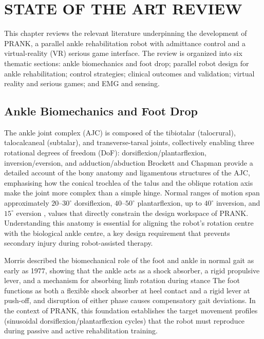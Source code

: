 \chapter{STATE OF THE ART REVIEW}

This chapter reviews the relevant literature underpinning the development of PRANK, a parallel ankle rehabilitation robot with admittance control and a virtual-reality (VR) serious game interface. The review is organized into six thematic sections: ankle biomechanics and foot drop; parallel robot design for ankle rehabilitation; control strategies; clinical outcomes and validation; virtual reality and serious games; and EMG and sensing.

\section{Ankle Biomechanics and Foot Drop}

The ankle joint complex (AJC) is composed of the tibiotalar (talocrural), talocalcaneal (subtalar), and transverse-tarsal joints, collectively enabling three rotational degrees of freedom (DoF): dorsiflexion/plantarflexion, inversion/eversion, and adduction/abduction %
Brockett and Chapman \cite{Brockett2016} provide a detailed account of the bony anatomy and ligamentous structures of the AJC, emphasising how the conical trochlea of the talus and the oblique rotation axis make the joint more complex than a simple hinge.
Normal ranges of motion span approximately $20$--$30^{\circ}$ dorsiflexion, $40$--$50^{\circ}$ plantarflexion, up to $40^{\circ}$ inversion, and $15^{\circ}$ eversion \cite{Tsoi2009}, values that directly constrain the design workspace of PRANK.
Understanding this anatomy is essential for aligning the robot's rotation centre with the biological ankle centre, a key design requirement that prevents secondary injury during robot-assisted therapy.

Morris described the biomechanical role of the foot and ankle in normal gait as early as 1977, showing that the ankle acts as a shock absorber, a rigid propulsive lever, and a mechanism for absorbing limb rotation during stance %
The foot functions as both a flexible shock absorber at heel contact and a rigid lever at push-off, and disruption of either phase causes compensatory gait deviations.
In the context of PRANK, this foundation establishes the target movement profiles (sinusoidal dorsiflexion/plantarflexion cycles) that the robot must reproduce during passive and active rehabilitation training.

